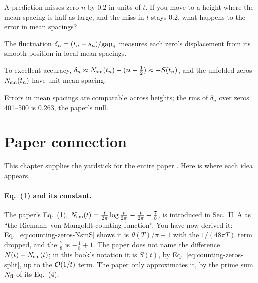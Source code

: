 \begin{checkpoint}
A prediction misses zero $n$ by $0.2$ in units of $t$. If you move to a height where the mean spacing is half as large, and the miss in $t$ stays $0.2$, what happens to the error in mean spacings?
\end{checkpoint}

\begin{keyideas}
\item The fluctuation $\delta_n=(t_n-s_n)/\mathrm{gap}_n$ measures each zero's displacement from its smooth position in local mean spacings.
\item To excellent accuracy, $\delta_n\approx N_{\mathrm{sm}}(t_n)-(n-\tfrac12)\approx-S(t_n)$, and the unfolded zeros $N_{\mathrm{sm}}(t_n)$ have unit mean spacing.
\item Errors in mean spacings are comparable across heights; the rms of $\delta_n$ over zeros 401--500 is $0.263$, the paper's null.
\end{keyideas}

\section{Paper connection}\label{sec:counting-zeros-paper}

This chapter supplies the yardstick for the entire paper \cite{soniR1}. Here is where each idea appears.

\paragraph{Eq.~(1) and its constant.} The paper's Eq.~(1), $N_{\mathrm{sm}}(t)=\frac t{2\pi}\log\frac t{2\pi}-\frac t{2\pi}+\frac78$, is introduced in Sec.~II~A as ``the Riemann--von Mangoldt counting function''. You have now derived it: Eq.~\eqref{eq:counting-zeros-NsmS} shows it is $\theta(T)/\pi+1$ with the $1/(48\pi T)$ term dropped, and the $\frac78$ is $-\frac18+1$. The paper does not name the difference $N(t)-N_{\mathrm{sm}}(t)$; in this book's notation it is $S(t)$, by Eq.~\eqref{eq:counting-zeros-split}, up to the $\mathcal{O}(1/t)$ term. The paper only approximates it, by the prime sum $N_{\mathrm{fl}}$ of its Eq.~(4).

